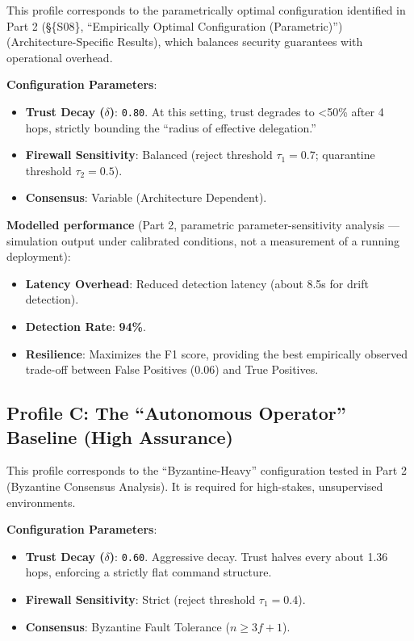 \documentclass[
]{article}
\providecommand{\tightlist}{%
  \setlength{\itemsep}{0pt}\setlength{\parskip}{0pt}}
\begin{document}
This profile corresponds to the parametrically optimal configuration
identified in Part 2 (\S\{S08\}, ``Empirically Optimal Configuration
(Parametric)'') (Architecture-Specific Results), which balances security
guarantees with operational overhead.

\textbf{Configuration Parameters}:

\begin{itemize}
\tightlist
\item
  \textbf{Trust Decay (\(\delta\))}: \texttt{0.80}. At this setting,
  trust degrades to \textless50\% after 4 hops, strictly bounding the
  ``radius of effective delegation.''
\item
  \textbf{Firewall Sensitivity}: Balanced (reject threshold
  \(\tau_1 = 0.7\); quarantine threshold \(\tau_2 = 0.5\)).
\item
  \textbf{Consensus}: Variable (Architecture Dependent).
\end{itemize}

\textbf{Modelled performance} (Part 2, parametric parameter-sensitivity
analysis --- simulation output under calibrated conditions, not a
measurement of a running deployment):

\begin{itemize}
\tightlist
\item
  \textbf{Latency Overhead}: Reduced detection latency
  (about 8.5s for drift detection).
\item
  \textbf{Detection Rate}: \textbf{94\%}.
\item
  \textbf{Resilience}: Maximizes the F1 score, providing the best
  empirically observed trade-off between False Positives (0.06) and True
  Positives.
\end{itemize}

\subsection{Profile C: The ``Autonomous Operator'' Baseline (High
Assurance)}\label{profile-c-the-autonomous-operator-baseline-high-assurance}

This profile corresponds to the ``Byzantine-Heavy'' configuration tested
in Part 2 (Byzantine Consensus Analysis). It is required for
high-stakes, unsupervised environments.

\textbf{Configuration Parameters}:

\begin{itemize}
\tightlist
\item
  \textbf{Trust Decay (\(\delta\))}: \texttt{0.60}. Aggressive decay.
  Trust halves every about 1.36 hops, enforcing a strictly flat
  command structure.
\item
  \textbf{Firewall Sensitivity}: Strict (reject threshold
  \(\tau_1 =0.4\)).
\item
  \textbf{Consensus}: Byzantine Fault Tolerance (\(n \ge 3f+1\)).
\end{itemize}
\end{document}
